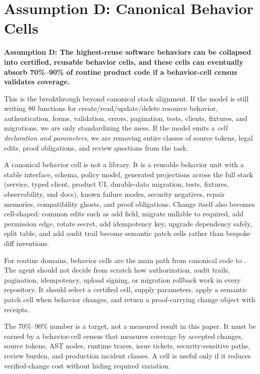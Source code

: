 \section{Assumption D: Canonical Behavior Cells}

\textbf{Assumption D: The highest-reuse software behaviors can be collapsed into certified, reusable behavior cells, and these cells can eventually absorb 70\%--90\% of routine product code if a behavior-cell census validates coverage.}

This is the breakthrough beyond canonical stack alignment. If the model is still writing 80 functions for create/read/update/delete resource behavior, authentication, forms, validation, errors, pagination, tests, clients, fixtures, and migrations, we are only standardizing the mess. If the model emits a \emph{cell declaration and parameters}, we are removing entire classes of source tokens, legal edits, proof obligations, and review questions from the task.

A canonical behavior cell is not a library. It is a reusable behavior unit with a stable interface, schema, policy model, generated projections across the full stack (service, typed client, product UI, durable-data migration, tests, fixtures, observability, and docs), known failure modes, security negatives, repair memories, compatibility ghosts, and proof obligations. Change itself also becomes cell-shaped: common edits such as add field, migrate nullable to required, add permission edge, rotate secret, add idempotency key, upgrade dependency safely, split table, and add audit trail become semantic patch cells rather than bespoke diff inventions.

For routine domains, behavior cells are the main path from canonical code to \mfdl{}. The agent should not decide from scratch how authorization, audit trails, pagination, idempotency, upload signing, or migration rollback work in every repository. It should select a certified cell, supply parameters, apply a semantic patch cell when behavior changes, and return a proof-carrying change object with receipts.

The 70\%--90\% number is a target, not a measured result in this paper. It must be earned by a behavior-cell census that measures coverage by accepted changes, source tokens, AST nodes, runtime traces, issue tickets, security-sensitive paths, review burden, and production incident classes. A cell is useful only if it reduces verified-change cost without hiding required variation.


